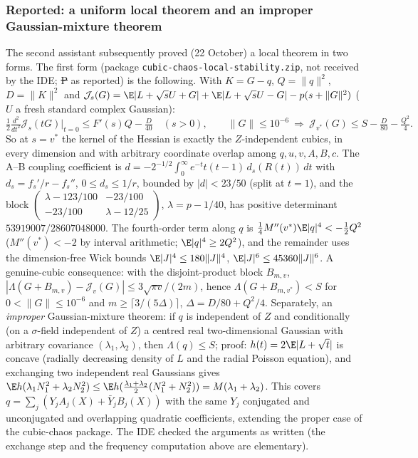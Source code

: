 \subsubsection{Reported: a uniform local theorem and an improper Gaussian-mixture theorem}
\label{sec:local-stability-reported}
The second assistant subsequently proved (22 October) a local theorem
in two forms. The first form (package
\texttt{cubic-chaos-local-stability.zip}, not received by the IDE;
\st{P} as reported) is the following. With
$K=G-q$, $Q=\|q\|^2$, $D=\|K\|^2$ and
$\mathcal J_s(G)=\E|L+\sqrt sU+G|+\E|L+\sqrt sU-G|-p(s+\|G\|^2)$
($U$ a fresh standard complex Gaussian):
\[
 \tfrac12\tfrac{d^2}{dt^2}\mathcal J_s(tG)\big|_{t=0}\le F'(s)Q-\tfrac{D}{40}
 \quad(s>0),\qquad
 \|G\|\le10^{-6}\ \Longrightarrow\ \mathcal J_{v^*}(G)\le S-\tfrac{D}{80}-\tfrac{Q^2}4 .
\]
So at $s=v^*$ the kernel of the Hessian is exactly the $Z$-independent
cubics, in every dimension and with arbitrary coordinate overlap among
$q,u,v,A,B,c$. The A--B coupling coefficient is
$d=-2^{-1/2}\int_0^\infty e^{-t}t(t-1)\,d_s(R(t))\,dt$ with
$d_s=f_s'/r-f_s''$, $0\le d_s\le1/r$, bounded by $|d|<23/50$ (split at
$t=1$), and the block
$\begin{pmatrix}\lambda-123/100&-23/100\\-23/100&\lambda-12/25\end{pmatrix}$,
$\lambda=p-1/40$, has positive determinant $53919007/28607048000$. The
fourth-order term along $q$ is $\frac14M''(v^*)\E|q|^4<-\frac12Q^2$
($M''(v^*)<-2$ by interval arithmetic; $\E|q|^4\ge2Q^2$), and the
remainder uses the dimension-free Wick bounds $\E|J|^4\le180\|J\|^4$,
$\E|J|^6\le45360\|J\|^6$. A genuine-cubic consequence: with the
disjoint-product block $B_{m,v}$,
$|\Lambda(G+B_{m,v})-\mathcal J_v(G)|\le3\sqrt{\pi v}/(2m)$, hence
$\Lambda(G+B_{m,v^*})<S$ for $0<\|G\|\le10^{-6}$ and
$m\ge\lceil3/(5\Delta)\rceil$, $\Delta=D/80+Q^2/4$.
Separately, an \emph{improper} Gaussian-mixture theorem: if $q$ is
independent of $Z$ and conditionally (on a $\sigma$-field independent
of $Z$) a centred real two-dimensional Gaussian with arbitrary
covariance $(\lambda_1,\lambda_2)$, then $\Lambda(q)\le S$; proof:
$h(t)=2\E|L+\sqrt t|$ is concave (radially decreasing density of $L$
and the radial Poisson equation), and exchanging two independent real
Gaussians gives
$\E h(\lambda_1N_1^2+\lambda_2N_2^2)\le\E h(\tfrac{\lambda_1+\lambda_2}2(N_1^2+N_2^2))=M(\lambda_1+\lambda_2)$.
This covers $q=\sum_j(Y_jA_j(X)+\bar Y_jB_j(X))$ with the same $Y_j$
conjugated and unconjugated and overlapping quadratic coefficients,
extending the proper case of the cubic-chaos package. The IDE checked
the arguments as written (the exchange step and the frequency
computation above are elementary).

